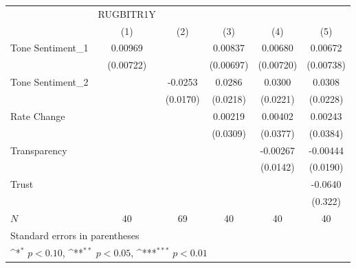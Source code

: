 {
\def\sym#1{\ifmmode^{#1}\else\(^{#1}\)\fi}
\begin{tabular}{l*{5}{c}}
\hline\hline
            &   RUGBITR1Y         &                     &                     &                     &                     \\
            &\multicolumn{1}{c}{(1)}         &\multicolumn{1}{c}{(2)}         &\multicolumn{1}{c}{(3)}         &\multicolumn{1}{c}{(4)}         &\multicolumn{1}{c}{(5)}         \\
\hline
Tone Sentiment\_{1}&     0.00969         &                     &     0.00837         &     0.00680         &     0.00672         \\
            &   (0.00722)         &                     &   (0.00697)         &   (0.00720)         &   (0.00738)         \\
[1em]
Tone Sentiment\_{2}&                     &     -0.0253         &      0.0286         &      0.0300         &      0.0308         \\
            &                     &    (0.0170)         &    (0.0218)         &    (0.0221)         &    (0.0228)         \\
[1em]
Rate Change &                     &                     &     0.00219         &     0.00402         &     0.00243         \\
            &                     &                     &    (0.0309)         &    (0.0377)         &    (0.0384)         \\
[1em]
Transparency&                     &                     &                     &    -0.00267         &    -0.00444         \\
            &                     &                     &                     &    (0.0142)         &    (0.0190)         \\
[1em]
Trust       &                     &                     &                     &                     &     -0.0640         \\
            &                     &                     &                     &                     &     (0.322)         \\
\hline
\(N\)       &          40         &          69         &          40         &          40         &          40         \\
\hline\hline
\multicolumn{6}{l}{\footnotesize Standard errors in parentheses}\\
\multicolumn{6}{l}{\footnotesize \sym{*} \(p<0.10\), \sym{**} \(p<0.05\), \sym{***} \(p<0.01\)}\\
\end{tabular}
}

